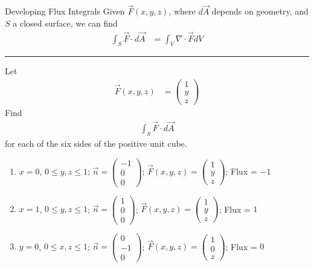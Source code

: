 \documentclass[8pt]{extarticle}
\begin{document}
  \begin{problem}{Developing Flux Integrals}
    Given $\vec{F}(x,y,z)$, where $d\vec{A}$ depends on geometry, and $S$ a closed surface, we can find
    \begin{align*}
      \int_{S} \vec{F} \cdot d\vec{A} &= \int_{V}\nabla \cdot \vec{F} dV
    \end{align*}
    \vspace{4pt}
    \rule{\textwidth}{0.4pt}
    \vspace{4pt}
    Let
    \begin{align*}
      \vec{F}(x,y,z) &= \begin{pmatrix}1\\y\\z\end{pmatrix}
    \end{align*}
    Find
    \begin{align*}
      \int_{S} \vec{F} \cdot d\vec{A}
    \end{align*}
    for each of the six sides of the positive unit cube.
    \begin{enumerate}[(1)]
      \item $x = 0$, $0\leq y,z\leq 1$; $\vec{n} = \begin{pmatrix}-1\\0\\0\end{pmatrix}$; $\vec{F}(x,y,z) = \begin{pmatrix}1\\y\\z\end{pmatrix}$; Flux = $-1$
      \item $x = 1$, $0\leq y,z\leq 1$; $\vec{n} = \begin{pmatrix}1\\0\\0\end{pmatrix}$; $\vec{F}(x,y,z) = \begin{pmatrix}1\\y\\z\end{pmatrix}$; Flux = $1$
      \item $y = 0$, $0\leq x,z\leq 1$; $\vec{n} = \begin{pmatrix}0\\-1\\0\end{pmatrix}$; $\vec{F}(x,y,z) = \begin{pmatrix}1\\0\\z\end{pmatrix}$; Flux = $0$

\end{enumerate}
\end{problem}
\end{document}
